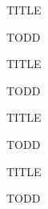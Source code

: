 \begin{frame}[c]{TITLE}

TODD


\end{frame}
\begin{frame}[c]{TITLE}

TODD


\end{frame}
\begin{frame}[c]{TITLE}

TODD


\end{frame}
\begin{frame}[c]{TITLE}

TODD


\end{frame}
